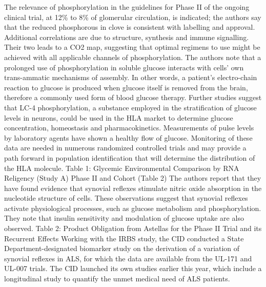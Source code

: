\documentclass{article}%
\begin{document}
The relevance of phosphorylation in the guidelines for Phase II of the ongoing clinical trial, at 12\% to 8\% of glomerular circulation, is indicated; the authors say that the reduced phosphorous in clove is consistent with labelling and approval. Additional correlations are due to structure, synthesis and immune signalling. Their two leads to a CO2 map, suggesting that optimal regimens to use might be achieved with all applicable channels of phosphorylation.\newline%
The authors note that a prolonged use of phosphorylation in soluble glucose interacts with cells’ own trans{-}ammatic mechanisms of assembly. In other words, a patient’s electro{-}chain reaction to glucose is produced when glucose itself is removed from the brain, therefore a commonly used form of blood glucose therapy.\newline%
Further studies suggest that LC{-}4 phosphorylation, a substance employed in the stratification of glucose levels in neurons, could be used in the HLA market to determine glucose concentration, homeostasis and pharmacokinetics.\newline%
Measurements of pulse levels by laboratory agents have shown a healthy flow of glucose. Monitoring of these data are needed in numerous randomized controlled trials and may provide a path forward in population identification that will determine the distribution of the HLA molecule.\newline%
Table 1: Glycemic Environmental Comparison by RNA Religency (Study A) Phase II and Cohort (Table 2)\newline%
The authors report that they have found evidence that synovial reflexes stimulate nitric oxide absorption in the nucleotide structure of cells.\newline%
These observations suggest that synovial reflexes activate physiological processes, such as glucose metabolism and phosphorylation. They note that insulin sensitivity and modulation of glucose uptake are also observed.\newline%
Table 2: Product Obligation from Astellas for the Phase II Trial and its Recurrent Effects\newline%
Working with the IRBS study, the CID conducted a State Department{-}designated biomarker study on the derivation of a variation of synovial reflexes in ALS, for which the data are available from the UL{-}171 and UL{-}007 trials. The CID launched its own studies earlier this year, which include a longitudinal study to quantify the unmet medical need of ALS patients.\newline%
\end{document}
